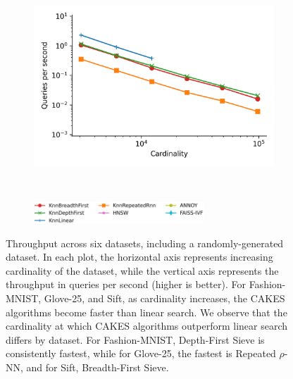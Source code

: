 \begin{figure}
\begin{subfigure}[b]{0.5\textwidth}
        \label{fig:results:silva-scaling}
    \end{subfigure}%
    \begin{subfigure}[b]{0.5\textwidth}
        \includegraphics[width=0.99\textwidth]{plots/radio-ml_Ball_10_throughput.png}
        \label{fig:results:radioml-scaling}
    \end{subfigure}%
    \\
    \begin{subfigure}[b]{0.94\textwidth}
        \centering
        \includegraphics[width=0.7\textwidth]{plots/legend.png}
        \label{fig:results:scaling-legend}
    \end{subfigure}%
    \caption{Throughput across six datasets, including a randomly-generated dataset.
    In each plot, the horizontal axis represents increasing cardinality of the dataset, while the vertical axis represents the throughput in queries per second (higher is better).
    For Fashion-MNIST, Glove-25, and Sift, as cardinality increases, the CAKES algorithms become faster than linear search.
    We observe that the cardinality at which CAKES algorithms outperform linear search differs by dataset. 
    For Fashion-MNIST, Depth-First Sieve is consistently fastest, while for Glove-25, the fastest is Repeated $\rho$-NN, and for Sift, Breadth-First Sieve.
}
\end{figure}

